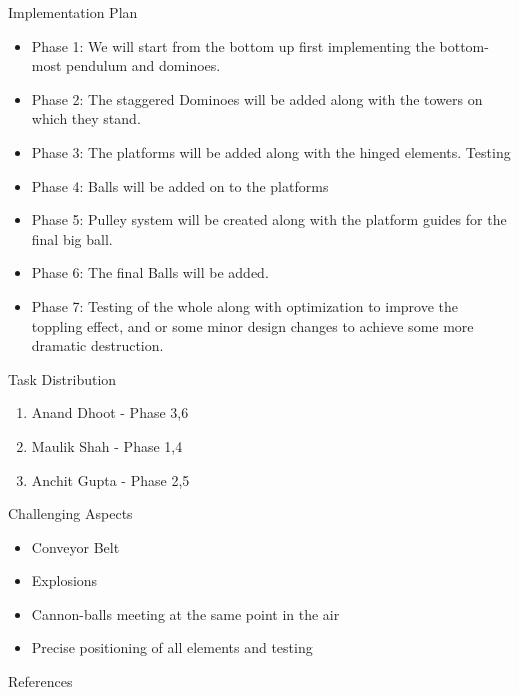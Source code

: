 \documentclass[a4paper,12pt]{article}
\begin{document}
\begin{section}{Implementation Plan}
\begin{itemize}
\item
Phase 1:
We will start from the bottom up first implementing the bottom-most pendulum and dominoes.
\item
Phase 2: The staggered Dominoes will be added along with the towers on which they stand.
\item
Phase 3:
The platforms will be added along with the hinged elements.
Testing
\item
Phase 4:
Balls will be added on to the platforms
\item
Phase 5:
Pulley system will be created along with the platform guides for the final big ball.
\item
Phase 6:
The final Balls will be added.
\item
Phase 7:
Testing of the whole along with optimization to improve the toppling effect, and or some minor design changes to achieve some more dramatic destruction.
\end{itemize}
\end{section}
\bigskip

\begin{section}{Task Distribution}
\begin{enumerate}
\item Anand Dhoot - Phase 3,6 
\item Maulik Shah - Phase 1,4
\item Anchit Gupta - Phase 2,5
\end{enumerate}
\end{section}
\bigskip

\begin{section}{Challenging Aspects}
\begin{itemize}
\item Conveyor Belt
\item Explosions
\item Cannon-balls meeting at the same point in the air
\item Precise positioning of all elements and testing
\end{itemize}
\end{section}
\bigskip

\begin{section}{References}

\end{section}
\bigskip
\end{document}
